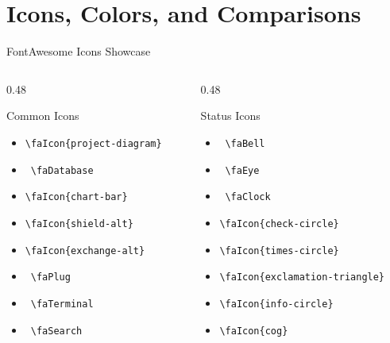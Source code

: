 \section{Icons, Colors, and Comparisons}

\begin{frame}{FontAwesome Icons Showcase}
  \begin{columns}[T]
    \begin{column}{0.48\textwidth}
      \begin{block}{\scriptsize Common Icons}
        \scriptsize
        \begin{itemize}
          \setlength{\itemsep}{2pt}
          \item {} \texttt{\textbackslash faIcon\{project-diagram\}}
          \item \faDatabase\ \texttt{\textbackslash faDatabase}
          \item {} \texttt{\textbackslash faIcon\{chart-bar\}}
          \item {} \texttt{\textbackslash faIcon\{shield-alt\}}
          \item {} \texttt{\textbackslash faIcon\{exchange-alt\}}
          \item \faPlug\ \texttt{\textbackslash faPlug}
          \item \faTerminal\ \texttt{\textbackslash faTerminal}
          \item \faSearch\ \texttt{\textbackslash faSearch}
        \end{itemize}
      \end{block}
    \end{column}
    \begin{column}{0.48\textwidth}
      \begin{block}{\scriptsize Status Icons}
        \scriptsize
        \begin{itemize}
          \setlength{\itemsep}{2pt}
          \item \faBell\ \texttt{\textbackslash faBell}
          \item \faEye\ \texttt{\textbackslash faEye}
          \item \faClock\ \texttt{\textbackslash faClock}
          \item {} \texttt{\textbackslash faIcon\{check-circle\}}
          \item {} \texttt{\textbackslash faIcon\{times-circle\}}
          \item {} \texttt{\textbackslash faIcon\{exclamation-triangle\}}
          \item {} \texttt{\textbackslash faIcon\{info-circle\}}
          \item {} \texttt{\textbackslash faIcon\{cog\}}
        \end{itemize}
      \end{block}
    \end{column}
  \end{columns}
\end{frame}

